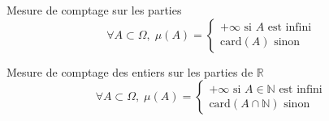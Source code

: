 \begin{Example}{Mesure de comptage sur les parties}{}
\begin{equation}
  \forall A \subset \Omega, \; \mu(A) = \begin{cases}
  + \infty \text{ si } A \text{ est infini} \\ 
  \mathrm{card}(A) \text{ sinon }
  \end{cases}
\end{equation}
\end{Example}

\begin{Example}{Mesure de comptage des entiers sur les parties de $\mathbb{R}$}{}
\begin{equation}
  \forall A \subset \Omega, \; \mu(A) = \begin{cases}
  + \infty \text{ si } A \in \mathbb{N} \text{ est infini} \\ 
  \mathrm{card}(A \cap \mathbb{N}) \text{ sinon }
  \end{cases}
\end{equation}
\end{Example}


